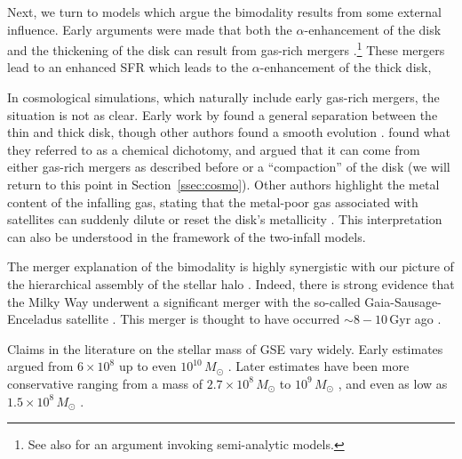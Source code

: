 \documentclass[twocolumn,linenumbers,trackchanges]{aastex631}
\newcommand{\Msun}{\ensuremath{M_{\odot}}}
\newcommand{\Gyr}{\ensuremath{\textrm{Gyr}}}
\begin{document}
Next, we turn to models which argue the bimodality results from some external influence. Early arguments were made that both the $\alpha$-enhancement of the disk and the thickening of the disk can result from gas-rich mergers \citep{2004ApJ...612..894B,2005ApJ...630..298B,2007ApJ...658...60B,2010MNRAS.402.1489R}.\footnote{See also \citet{2009MNRAS.400.1347C} for an argument invoking semi-analytic models.} These mergers lead to an enhanced SFR which leads to the $\alpha$-enhancement of the thick disk, 

In cosmological simulations, which naturally include early gas-rich mergers, the situation is not as clear. Early work by \citet{2012MNRAS.426..690B} found a general separation between the thin and thick disk, though other authors found a smooth evolution \citep{2013A&A...558A...9M}. \citet{2018MNRAS.474.3629G} found what they referred to as a chemical dichotomy, and argued that it can come from either gas-rich mergers as described before or a ``compaction'' of the disk (we will return to this point in Section~\ref{ssec:cosmo}). Other authors highlight the metal content of the infalling gas, stating that the metal-poor gas associated with satellites can suddenly dilute or reset the disk's metallicity \citep{2020MNRAS.491.5435B,2024MNRAS.528L.122C}. This interpretation can also be understood in the framework of the two-infall models.

The merger explanation of the bimodality is highly synergistic with our picture of the hierarchical assembly of the stellar halo \citep{2005ApJ...635..931B}. Indeed, there is strong evidence that the Milky Way underwent a significant merger with the so-called Gaia-Sausage-Enceladus satellite \citep[GSE;][]{2018MNRAS.478..611B,2018Natur.563...85H,2020ApJ...901...48N}. This merger is thought to have occurred $\sim8-10\,\Gyr$ ago \citep[see also][]{2020ApJ...897L..18B}. 

Claims in the literature on the stellar mass of GSE vary widely. Early estimates argued from $6\times10^8$ up to even $10^{10}\,\Msun$ \citep{2018MNRAS.478..611B,2018Natur.563...85H,2019MNRAS.484.4471F,2019MNRAS.487L..47V,2019MNRAS.488.1235M,2020MNRAS.493.5195D,2020MNRAS.497..109F}. Later estimates have been more conservative ranging from a mass of $2.7\times10^8\,\Msun$ to $10^9\,\Msun$ \citep{2019MNRAS.482.3426M,2020MNRAS.492.3631M,2020MNRAS.498.2472K,2021ApJ...923...92N,2022AJ....164..249H}, and even as low as $1.5\times10^8\,\Msun$ \citep{2023MNRAS.526.1209L}.
\end{document}
